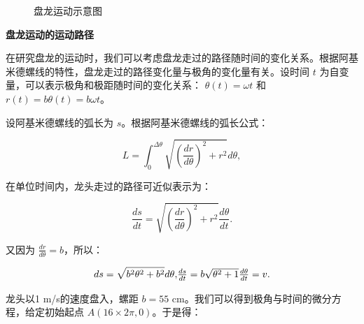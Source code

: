 \documentclass[withoutpreface, bwprint]{cumcmthesis} %
\begin{document}
\begin{figure}[!h]
{
    }

    \caption{盘龙运动示意图}
    \label{fig:dragon_motion}
\end{figure}

\textbf{盘龙运动的运动路径}

在研究盘龙的运动时，我们可以考虑盘龙走过的路径随时间的变化关系。根据阿基米德螺线的特性，盘龙走过的路径变化量与极角的变化量有关。设时间 $ t $ 为自变量，可以表示极角和极距随时间的变化关系： $\theta(t) = \omega t$ 和 $r(t) = b\theta(t) = b\omega t$。

设阿基米德螺线的弧长为 $ s $。根据阿基米德螺线的弧长公式：

\begin{equation}
    L = \int_{0}^{\Delta\theta} \sqrt{\left( \frac{dr}{d\theta} \right)^2 + r^2} d\theta,
\end{equation}

在单位时间内，龙头走过的路径可近似表示为：

\begin{equation}
    \frac{ds}{dt} = \sqrt{\left( \frac{dr}{d\theta} \right)^2 + r^2} \frac{d\theta}{dt}.
\end{equation}

又因为 $\frac{dr}{d\theta} = b$，所以：

\begin{equation}
    ds = \sqrt{b^2 \theta^2 + b^2} d\theta,$$ $$\frac{ds}{dt} = b\sqrt{\theta^2 + 1} \frac{d\theta}{dt} = v.
\end{equation}

龙头以1 m/s的速度盘入，螺距 $ b = 55 $ cm。我们可以得到极角与时间的微分方程，给定初始起点 $ A(16 \times 2\pi, 0) $。于是得：
\end{document}
